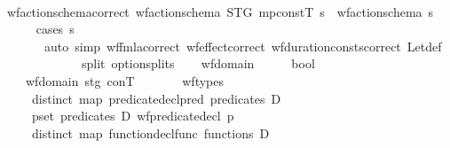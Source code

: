 \begin{isabellebody}
\isanewline
\ \ \isamarkupfalse%
\ wf{\isacharunderscore}{\kern0pt}action{\isacharunderscore}{\kern0pt}schema{\isacharprime}{\kern0pt}{\isacharunderscore}{\kern0pt}correct{\isacharcolon}{\kern0pt}\ {\isachardoublequoteopen}wf{\isacharunderscore}{\kern0pt}action{\isacharunderscore}{\kern0pt}schema{\isacharprime}{\kern0pt}\ STG\ mp{\isacharunderscore}{\kern0pt}constT\ s\ {\isacharequal}{\kern0pt}\ wf{\isacharunderscore}{\kern0pt}action{\isacharunderscore}{\kern0pt}schema\ s{\isachardoublequoteclose}\isanewline
%
\isadelimproof
\ \ \ \ %
\endisadelimproof
%
\isatagproof
{}\isamarkupfalse%
\ {\isacharparenleft}{\kern0pt}cases\ s{\isacharparenright}{\kern0pt}\ \isanewline
\ \ \ \ \ \ \ {\isacharparenleft}{\kern0pt}auto\ simp{\isacharcolon}{\kern0pt}\ wf{\isacharunderscore}{\kern0pt}fmla{\isacharprime}{\kern0pt}{\isacharunderscore}{\kern0pt}correct\ wf{\isacharunderscore}{\kern0pt}effect{\isacharprime}{\kern0pt}{\isacharunderscore}{\kern0pt}correct\ wf{\isacharunderscore}{\kern0pt}duration{\isacharunderscore}{\kern0pt}consts{\isacharprime}{\kern0pt}{\isacharunderscore}{\kern0pt}correct\ Let{\isacharunderscore}{\kern0pt}def\ \isanewline
\ \ \ \ \ \ \ \ \ \ \ \ \ split{\isacharcolon}{\kern0pt}\ option{\isachardot}{\kern0pt}splits{\isacharparenright}{\kern0pt}%
\endisatagproof
{\isafoldproof}%
%
\isadelimproof
\isanewline
%
\endisadelimproof
\isanewline
\ \ \isamarkupfalse%
\ wf{\isacharunderscore}{\kern0pt}domain{\isacharprime}{\kern0pt}\ {\isacharcolon}{\kern0pt}{\isacharcolon}{\kern0pt}\ {\isachardoublequoteopen}{\isacharunderscore}{\kern0pt}\ {\isasymRightarrow}\ {\isacharunderscore}{\kern0pt}\ {\isasymRightarrow}\ bool{\isachardoublequoteclose}\ \isanewline
\ \ \ \ {\isachardoublequoteopen}wf{\isacharunderscore}{\kern0pt}domain{\isacharprime}{\kern0pt}\ stg\ conT\ {\isasymequiv}\isanewline
\ \ \ \ \ \ wf{\isacharunderscore}{\kern0pt}types\isanewline
\ \ \ \ {\isasymand}\ distinct\ {\isacharparenleft}{\kern0pt}map\ {\isacharparenleft}{\kern0pt}predicate{\isacharunderscore}{\kern0pt}decl{\isachardot}{\kern0pt}pred{\isacharparenright}{\kern0pt}\ {\isacharparenleft}{\kern0pt}predicates\ D{\isacharparenright}{\kern0pt}{\isacharparenright}{\kern0pt}\isanewline
\ \ \ \ {\isasymand}\ {\isacharparenleft}{\kern0pt}{\isasymforall}p{\isasymin}set\ {\isacharparenleft}{\kern0pt}predicates\ D{\isacharparenright}{\kern0pt}{\isachardot}{\kern0pt}\ wf{\isacharunderscore}{\kern0pt}predicate{\isacharunderscore}{\kern0pt}decl\ p{\isacharparenright}{\kern0pt}\isanewline
\ \ \ \ {\isasymand}\ distinct\ {\isacharparenleft}{\kern0pt}map\ {\isacharparenleft}{\kern0pt}function{\isacharunderscore}{\kern0pt}decl{\isachardot}{\kern0pt}func{\isacharparenright}{\kern0pt}\ {\isacharparenleft}{\kern0pt}functions\ D{\isacharparenright}{\kern0pt}{\isacharparenright}{\kern0pt}\isanewline

\end{isabellebody}
